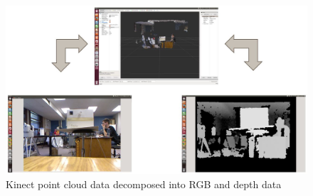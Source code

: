 \documentclass{article}
\begin{document}
\begin{figure}
	\centering
	\includegraphics[width=1.0\textwidth]{RVIZ_Decomposition.JPG}
	\caption{Kinect point cloud data decomposed into RGB and depth data}
	\label{fig:RVIZ_decomp}
\end{figure}
\end{document}
